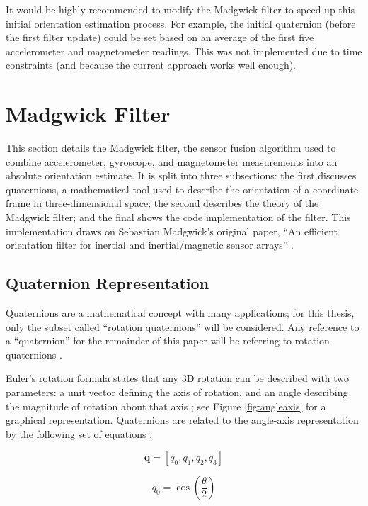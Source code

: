 \documentclass[12pt,a4paper]{report}
\begin{document}
It would be highly recommended to modify the Madgwick filter to speed up this initial orientation estimation process. For example, the initial quaternion (before the first filter update) could be set based on an average of the first five accelerometer and magnetometer readings. This was not implemented due to time constraints (and because the current approach works well enough).

\section{Madgwick Filter} \label{sec:4s4}
This section details the Madgwick filter, the sensor fusion algorithm used to combine accelerometer, gyroscope, and magnetometer measurements into an absolute orientation estimate. It is split into three subsections: the first discusses quaternions, a mathematical tool used to describe the orientation of a coordinate frame in three-dimensional space; the second describes the theory of the Madgwick filter; and the final shows the code implementation of the filter. This implementation draws on Sebastian Madgwick’s original paper, “An efficient orientation filter for inertial and inertial/magnetic sensor arrays” \cite{madgwick}.

\subsection{Quaternion Representation} \label{ssec:4s4s1}
Quaternions are a mathematical concept with many applications; for this thesis, only the subset called “rotation quaternions” will be considered. Any reference to a “quaternion” for the remainder of this paper will be referring to rotation quaternions \cite{quaternionuse}. 

Euler’s rotation formula states that any 3D rotation can be described with two parameters: a unit vector defining the axis of rotation, and an angle describing the magnitude of rotation about that axis \cite{quaternionuse}; see Figure \ref{fig:angleaxis} for a graphical representation. Quaternions are related to the angle-axis representation by the following set of equations \cite{quaternionuse}:

\begin{equation} \label{eq:qdef}
	\mathbf{q} = [q_0, q_1, q_2, q_3]
\end{equation}

\begin{equation} \label{eq:q0}
	q_0 = \cos\left(\frac{\theta}{2}\right)
\end{equation}
\end{document}
